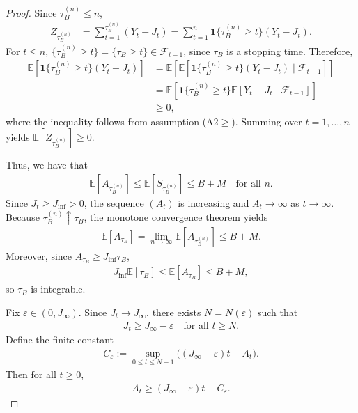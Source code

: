 \begin{proof}
Since $\tau_B^{(n)} \leq n$,
\begin{align*}
Z_{\tau_B^{(n)}}
&= \sum_{t=1}^{\tau_B^{(n)}} (Y_t - J_t)
= \sum_{t=1}^n \mathbf{1}\{\tau_B^{(n)} \geq t\} (Y_t - J_t).
\end{align*}
For $t \leq n$, $\{\tau_B^{(n)} \geq t\} = \{\tau_B \geq t\} \in \mathcal{F}_{t-1}$,
since $\tau_B$ is a stopping time. Therefore,
\begin{align*}
\mathbb{E}\!\left[\mathbf{1}\{\tau_B^{(n)} \geq t\}(Y_t - J_t)\right]
&= \mathbb{E}\!\left[
\mathbb{E}\!\left[
\mathbf{1}\{\tau_B^{(n)} \geq t\}(Y_t - J_t)
\mid \mathcal{F}_{t-1}
\right]\right] \\
&= \mathbb{E}\!\left[
\mathbf{1}\{\tau_B^{(n)} \geq t\}
\mathbb{E}[Y_t - J_t \mid \mathcal{F}_{t-1}]
\right] \\
&\geq 0 ,
\end{align*}
where the inequality follows from assumption (A2$\ge$).
Summing over $t = 1,\dots,n$ yields $\mathbb{E}[Z_{\tau_B^{(n)}}] \geq 0$.

Thus, we have that
\begin{align*}
\mathbb{E}[A_{\tau_B^{(n)}}]
\leq \mathbb{E}[S_{\tau_B^{(n)}}]
\leq B + M
\quad \text{for all } n .
\end{align*}
Since $J_t \geq J_{\inf} > 0$, the sequence $(A_t)$ is increasing and
$A_t \to \infty$ as $t \to \infty$. Because $\tau_B^{(n)} \uparrow \tau_B$,
the monotone convergence theorem yields
\begin{align*}
\mathbb{E}[A_{\tau_B}]
= \lim_{n \to \infty} \mathbb{E}[A_{\tau_B^{(n)}}]
\leq B + M .
\end{align*} 
Moreover, since
$A_{\tau_B} \geq J_{\inf} \tau_B$,
\begin{align*}
J_{\inf} \mathbb{E}[\tau_B] \leq \mathbb{E}[A_{\tau_B}] \leq B + M ,
\end{align*}
so $\tau_B$ is integrable.

Fix $\varepsilon \in (0, J_\infty)$. Since $J_t \to J_\infty$, there exists
$N = N(\varepsilon)$ such that
\begin{align*}
J_t \geq J_\infty - \varepsilon \quad \text{for all } t \geq N .
\end{align*}
Define the finite constant
\begin{align*}
C_\varepsilon
:= \sup_{0 \leq t \leq N-1} \bigl((J_\infty - \varepsilon)t - A_t\bigr).
\end{align*}
Then for all $t \geq 0$,
\begin{align*}
A_t \geq (J_\infty - \varepsilon)t - C_\varepsilon .
\end{align*}


\end{proof}
